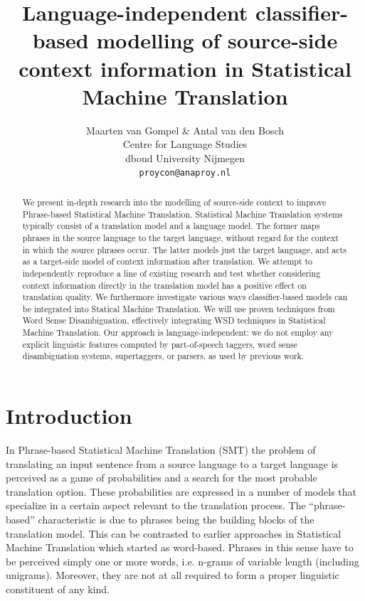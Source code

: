 \documentclass[smallextended]{svjour3}       %
\title{Language-independent classifier-based modelling of source-side context information in Statistical Machine Translation}
\author{Maarten van Gompel \& Antal van den Bosch \\
 Centre for Language Studies \\
  dboud University Nijmegen \\
  {\tt proycon@anaproy.nl}}
\theoremstyle{break}
\begin{document}
\maketitle

\begin{abstract} 
  We present in-depth research into the modelling of source-side
  context to improve Phrase-based Statistical Machine
  Translation. Statistical Machine Translation systems typically
  consist of a translation model and a language model. The former maps
  phrases in the source language to the target language, without
  regard for the context in which the source phrases occur. The latter
  models just the target language, and acts as a target-side model of
  context information after translation. We attempt to independently
  reproduce a line of existing research and test whether considering
  context information directly in the translation model has a positive
  effect on translation quality.  We furthermore investigate various
  ways classifier-based models can be integrated into Statical Machine
  Translation.  We will use proven techniques from Word Sense
  Disambiguation, effectively integrating WSD techniques in
  Statistical Machine Translation. Our approach is
  language-independent: we do not employ any explicit linguistic
  features computed by part-of-speech taggers, word sense
  disambiguation systems, supertaggers, or parsers, as used by
  previous work.
\end{abstract}

\section{Introduction}

In Phrase-based Statistical Machine Translation (SMT) the problem of
translating an input sentence from a source language to a target language is
perceived as a game of probabilities and a search for the most probable
translation option.  These probabilities are expressed in a number of models
that specialize in a certain aspect relevant to the translation process. The
``phrase-based'' characteristic is due to phrases being the building blocks of
the translation model. This can be contrasted to earlier approaches in
Statistical Machine Translation which started as word-based.  Phrases in this
sense have to be perceived simply one or more words, i.e.  n-grams of variable
length (including unigrams). Moreover, they are not at all required to form a
proper linguistic constituent of any kind.
\end{document}
